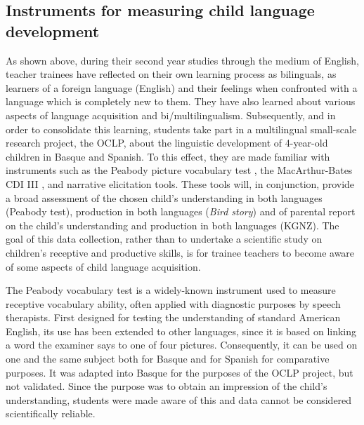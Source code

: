 \documentclass[output=paper]{../langscibook}
\begin{document}
\subsection{Instruments for measuring child language development}

As shown above, during their second year studies through the medium of English, teacher trainees have reflected on their own learning process as bilinguals, as learners of a foreign language (English) and their feelings when confronted with a language which is completely new to them. They have also learned about various aspects of language acquisition and bi/multilingualism. Subsequently, and in order to consolidate this learning, students take part in a multilingual small-scale research project, the OCLP, about the linguistic development of 4-year-old children in Basque and Spanish. To this effect, they are made familiar with instruments such as the Peabody picture vocabulary test \citep{DunnEtAl1986}, the MacArthur-Bates CDI III \citep{Dale2007}, and narrative elicitation tools. These tools will, in conjunction, provide a broad assessment of the chosen child's understanding in both languages (Peabody test), production in both languages (\emph{Bird story}) and of parental report on the child's understanding and production in both languages (KGNZ). The goal of this data collection, rather than to undertake a scientific study on children's receptive and productive skills, is for trainee teachers to become aware of some aspects of child language acquisition. 

The Peabody vocabulary test is a widely-known instrument used to measure receptive vocabulary ability, often applied with diagnostic purposes by speech therapists. First designed for testing the understanding of standard American English, its use has been extended to other languages, since it is based on linking a word the examiner says to one of four pictures. Consequently, it can be used on one and the same subject both for Basque and for Spanish for comparative purposes. It was adapted into Basque for the purposes of the OCLP project, but not validated. Since the purpose was to obtain an impression of the child's understanding, students were made aware of this and data cannot be considered scientifically reliable.
\end{document}
